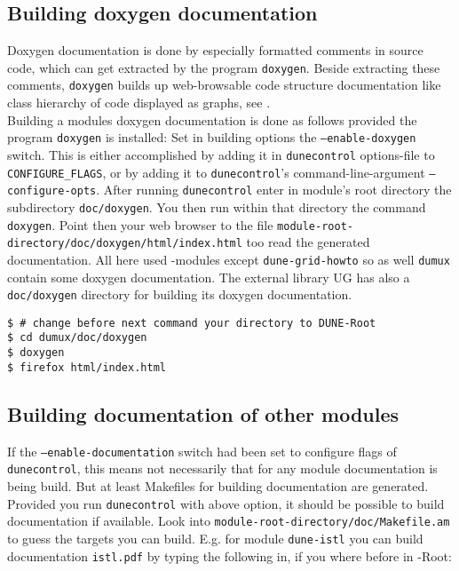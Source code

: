 \subsection{Building doxygen documentation} \label{sec:build-doxy-doc}

Doxygen documentation is done by especially formatted comments in source code, which can get extracted by the program 
\texttt{doxygen}. Beside extracting these comments, \texttt{doxygen} builds up web-browsable code structure documentation
like class hierarchy of code displayed as graphs, see \cite{DOXYGEN-HP}.\\

Building a modules doxygen documentation is done as follows provided the program \texttt{doxygen} is installed:
Set in building options the \texttt{--enable-doxygen} switch.
This is either accomplished by adding it in \texttt{dunecontrol} options-file to  \texttt{CONFIGURE\_FLAGS}, or by adding
it to  \texttt{dunecontrol}'s command-line-argument \texttt{--configure-opts}. 
After running \texttt{dunecontrol} enter in module's root directory the subdirectory \texttt{doc/doxygen}.
You then run within that directory the command \texttt{doxygen}. Point then your web browser to the file 
\texttt{module-root-directory/doc/doxygen/html/index.html} too read the generated documentation.
All here used \Dune-modules except \texttt{dune-grid-howto} so as well \texttt{dumux} contain some doxygen documentation.
The external library UG has also a \texttt{doc/doxygen} directory for building its doxygen documentation.

\begin{lstlisting}[style=Bash]
$ # change before next command your directory to DUNE-Root
$ cd dumux/doc/doxygen
$ doxygen
$ firefox html/index.html
\end{lstlisting}

\subsection{Building documentation of other \Dune modules}

If the \texttt{--enable-documentation} switch had been set to configure flags of
\texttt{dunecontrol}, this means not necessarily that for any 
\Dune module documentation is being build.
But at least Makefiles for building documentation are generated.
Provided you run \texttt{dunecontrol} with above option,
it should be possible to build documentation if available.
Look into \texttt{module-root-directory/doc/Makefile.am} to guess the targets you can build.
E.g. for module \texttt{dune-istl} you can build documentation \texttt{istl.pdf} by typing the following in,
if you where before in \Dune-Root:

